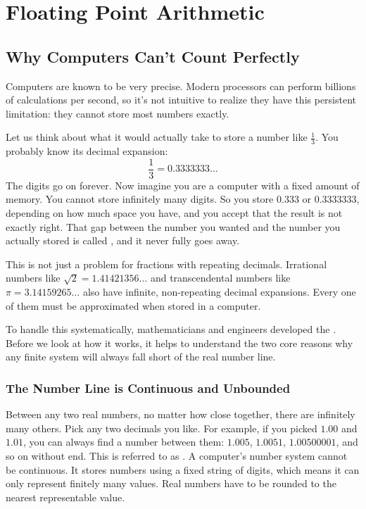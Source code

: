 \chapter{Floating Point Arithmetic}

\section{Why Computers Can't Count Perfectly}

Computers are known to be very precise. Modern processors can perform billions of calculations per second, so it's not intuitive to realize they have this persistent limitation: they cannot store most numbers exactly.

Let us think about what it would actually take to store a number like $\frac{1}{3}$. You
probably know its decimal expansion:
\[
    \frac{1}{3} = 0.3333333\ldots\]
The digits go on forever. Now imagine you are a computer with a fixed amount of memory.
You cannot store infinitely many digits. So you store $0.333$ or $0.3333333$, depending on how much space you have, and you accept that the result is not exactly right. That gap between the number you wanted and the number you
actually stored is called , and
it never fully goes away.

This is not just a problem for fractions with repeating decimals. Irrational numbers like
$\sqrt{2} = 1.41421356\ldots$ and transcendental numbers like $\pi = 3.14159265\ldots$
also have infinite, non-repeating decimal expansions. Every one of them must be
approximated when stored in a computer.

To handle this systematically, mathematicians and engineers developed the
. Before we look at how it works, it helps to understand the two core reasons why any finite system will always fall short of
the real number line.

\subsection{The Number Line is Continuous and Unbounded}

Between any two real numbers, no matter how close together, there are infinitely many
others. Pick any two decimals you like. For example, if you picked $1.00$ and $1.01$, you can always find a number between them: $1.005$, $1.0051$, $1.00500001$, and so on without end. This is referred to as . A computer's number system cannot be continuous. It stores numbers using a fixed string
of digits, which means it can only represent finitely many values. Real numbers have to be rounded to the nearest representable value. 

